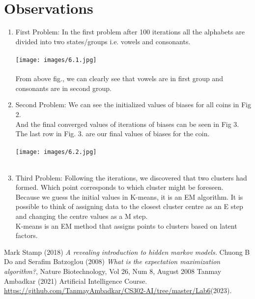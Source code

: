 \documentclass[letterpaper, 12 pt, conference]{IEEEtran}
\begin{document}
\section{Observations}
\begin{enumerate}
    \item First Problem: 
     In the first problem after 100 iterations all the alphabets are divided into two states/groups i.e. vowels and consonants.\\ \\
    \texttt{[image: images/6.1.jpg]}\\ \\
    From above fig., we can clearly see that vowels are in first group and consonants are in second group. \\
    \item Second Problem: 
    We can see the initialized values of biases for all coins in Fig 2.\\
    And the final converged values of iterations of biases can be seen in Fig 3.\\
    The last row in Fig. 3. are our final values of biases for the coin.\\ \\
    \texttt{[image: images/6.2.jpg]} \\ \\
    \item Third Problem: 
   Following the iterations, we discovered that two clusters had formed. Which point corresponds to which cluster might be foreseen.\\
    \indent Because we guess the initial values in K-means, it is an EM algorithm. It is possible to think of assigning data to the closest cluster centre as an E step and changing the centre values as a M step.\\ K-means is an EM method that assigns points to clusters based on latent factors.
\end{enumerate}
\begin{thebibliography}{}
\bibitem{}
Mark Stamp (2018) \emph{A revealing introduction to hidden markov models.}
\bibitem{}
Chuong B Do and Serafim Batzoglou (2008) \emph{What is the expectation maximization algorithm?}, Nature Biotechnology, Vol 26, Num 8, August 2008
\bibitem{}
Tanmay Ambadkar (2021) Artificial Intelligence Course. \\
\href{https://github.com/TanmayAmbadkar/CS302-AI/tree/master/Lab6}{https://github.com/TanmayAmbadkar/CS302-AI/tree/master/Lab6}(2023).
\end{thebibliography}
\end{document}
